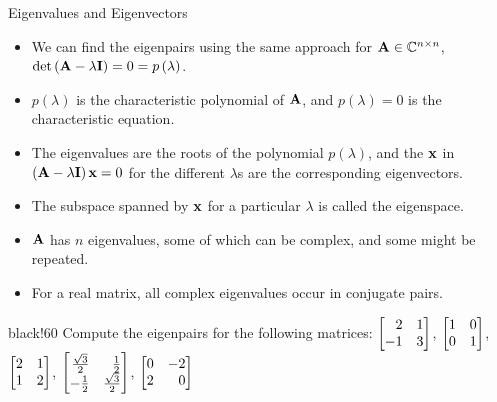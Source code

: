 \documentclass[aspectratio=169]{beamer}
\def\mf{\ensuremath\mathbf}
\def\mb{\ensuremath\mathbb}
\def\bmx{\ensuremath\begin{bmatrix*}[r]}
\def\emx{\ensuremath\end{bmatrix*}}
\newcommand{\demoex}[2]{\onslide<#1->\begin{color}{black!60} #2 \end{color}}
\begin{document}
\begin{frame}[t]{Eigenvalues and Eigenvectors}

\begin{itemize}
    \item We can find the eigenpairs using the same approach for $\mf{A} \in \mb{C}^{n \times n}$, $\det \left(\mf{A} - \lambda\mf{I}\right) = 0 = p\left(\lambda\right)$.

    \item $p\left(\lambda\right)$ is the characteristic polynomial of $\mf{A}$, and $p\left(\lambda\right) = 0$ is the characteristic equation.

    \item The eigenvalues are the roots of the polynomial $p\left(\lambda \right)$, and the $\mf{x}$ in $\left(\mf{A} - \lambda\mf{I}\right)\mf{x} = 0$ for the different $\lambda$s are the corresponding eigenvectors. 

    \item The subspace spanned by $\mf{x}$ for a particular $\lambda$ is called the eigenspace.

    \item $\mf{A}$ has $n$ eigenvalues, some of which can be complex, and some might be repeated.

    \item For a real matrix, all complex eigenvalues occur in conjugate pairs.
\end{itemize}

\demoex{2}{
    Compute the eigenpairs for the following matrices: $\bmx2 & 1\\-1 & 3\emx$, $\bmx1 & 0\\0 & 1\emx$, $\bmx2 & 1\\ 1 & 2\emx$, $\bmx\frac{\sqrt{3}}{2} & \frac{1}{2}\\-\frac{1}{2} & \frac{\sqrt{3}}{2}\emx$, $\bmx 0 & -2\\2 & 0\emx$
}
\end{frame}
\end{document}
